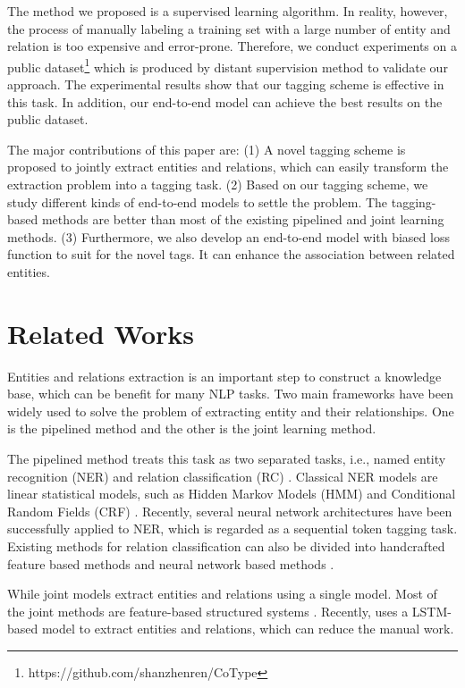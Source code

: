 \documentclass[11pt,a4paper]{article}
\begin{document}
The method we proposed is a supervised learning algorithm.
In reality, however, the process of manually labeling a training set
with a large number of entity and relation is too expensive and error-prone.
Therefore, we conduct experiments on a public dataset\footnote{https://github.com/shanzhenren/CoType}
which is produced by distant supervision method \cite{ren2016cotype} to validate our approach.
The experimental results show that our tagging scheme is effective in this task.
In addition, our end-to-end model can achieve the best results on the public dataset.

The major contributions of this paper are:
(1) A novel tagging scheme is proposed to jointly extract entities and relations, which can easily transform the extraction problem into a tagging task. (2)  Based on our tagging scheme, we study different kinds of end-to-end models to settle the problem.
   The tagging-based methods are better than most of the existing pipelined and joint learning methods.
(3) Furthermore, we also develop an end-to-end model with biased loss function to suit for the novel tags.
    It can enhance the association between related entities.

\section{Related Works}
\label{sect:relatedwork}
Entities and relations extraction is an important step to construct a knowledge base, which can be benefit for many NLP tasks.
Two main frameworks have been widely used to solve the problem of extracting
entity and their relationships. One is the pipelined method and the other is the joint learning method.

The pipelined method treats this task as two separated tasks, i.e., named entity recognition (NER) \cite{nadeau2007survey}
and relation classification (RC) \cite{fea2010utd}.
Classical NER models are linear statistical models, such as
Hidden Markov Models (HMM) and Conditional Random Fields (CRF) \cite{passos2014lexicon, Gang2015Joint}.
Recently, several neural network architectures \cite{chiu2015named,huang2015bidirectional,lstm-crf} have been successfully applied to NER, which is regarded as a sequential token tagging task.
Existing methods for relation classification can also be divided into
handcrafted feature based methods \cite{fea2010utd,fea2004combining} and
neural network based methods \cite{dlpcnn2015semantic,zsc,cnn2014relation,lstm2015classifying,CR}.

While joint models extract entities and relations using a single model.
Most of the joint methods are feature-based structured systems
\cite{ren2016cotype,yang2013joint,singh2013joint,miwa2014modeling,li2014}.
Recently, \cite{miwa2016end} uses a LSTM-based model to extract entities and relations, which can reduce the manual work.
\end{document}
